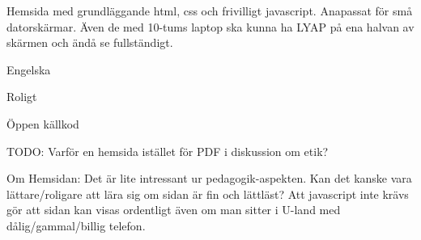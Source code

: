 \begin{binge}
Hemsida med grundläggande html, css och frivilligt javascript. Anapassat för små datorskärmar. Även de med 10-tums laptop ska kunna ha LYAP på ena halvan av skärmen och ändå se fullständigt.

Engelska

Roligt

Öppen källkod

TODO: Varför en hemsida istället för PDF i diskussion om etik?

Om Hemsidan: 
  Det är lite intressant ur pedagogik-aspekten. Kan det
  kanske vara lättare/roligare att lära sig om sidan är fin och
  lättläst? Att javascript inte krävs gör att sidan kan visas ordentligt
  även om man sitter i U-land med dålig/gammal/billig telefon.


\end{binge}
